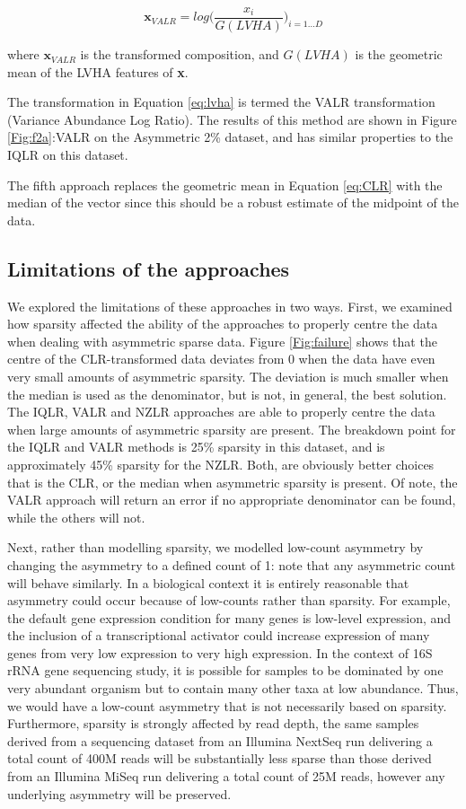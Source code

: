 \documentclass{bmcart}
\begin{document}
\begin{equation}
\textbf{x}_{VALR} = log  \big( \frac{x_i}{G(LVHA)}   \big)_{i=1 \dots D}
\label{eq:lvha}
\end{equation}

where $\textbf{x}_{VALR}$ is the transformed composition, and 	$G(LVHA)$ is the geometric mean of the LVHA features of \textbf{x}. 
 
 
The transformation in Equation \ref{eq:lvha} is termed the VALR transformation (Variance Abundance Log Ratio). The results of this method are shown in Figure \ref{Fig:f2a}:VALR on the Asymmetric 2\% dataset, and has similar properties to the IQLR on this dataset. 

The fifth approach replaces the geometric mean in Equation \ref{eq:CLR} with the  median of the vector since this should be a robust estimate of the midpoint of the data. 

\subsection*{Limitations of the approaches}

We  explored the limitations of these approaches in two ways. First, we examined how  sparsity affected the ability of the approaches to properly centre the data when dealing with asymmetric sparse data. Figure \ref{Fig:failure} shows that the centre of the CLR-transformed data deviates from 0 when the data have even very small amounts of asymmetric sparsity. The deviation is much smaller when the median is used as the denominator, but is not, in general, the best solution. The IQLR, VALR and NZLR approaches are able to properly centre the data when large amounts of asymmetric sparsity are present. The breakdown point for the IQLR and VALR methods is 25\% sparsity in this dataset, and is approximately  45\% sparsity for the NZLR. Both, are obviously better choices that is the CLR, or the median when asymmetric sparsity is present. Of note, the VALR approach will return an error if no appropriate denominator can be found, while the others will not. 

Next, rather than modelling sparsity, we modelled low-count asymmetry by changing the asymmetry to a defined count of 1: note that any asymmetric count will behave similarly. In a biological context it is entirely reasonable that asymmetry could occur because of low-counts  rather than sparsity. For example, the default gene expression condition for many genes is low-level expression, and the inclusion of a transcriptional activator could increase expression of many genes from very low expression to very high expression. In the context of 16S rRNA gene sequencing study, it is possible for samples to be dominated by one very abundant organism but to contain many other taxa at low abundance. Thus, we would have a low-count asymmetry that is not necessarily based on sparsity. Furthermore, sparsity is strongly affected by read depth, the same samples derived from a sequencing dataset from an Illumina NextSeq run delivering a total count of 400M reads will be substantially less sparse than those derived from an Illumina MiSeq run delivering a total count of 25M reads, however any underlying asymmetry will be preserved.
\end{document}
